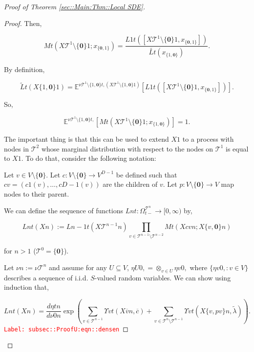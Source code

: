 \documentclass[12pt]{article}
\newcommand{\mb}{\mathbb}
\newcommand{\mc}{\mathcal}
\newcommand{\ra}{\rightarrow}
\newcommand{\ov}{\overline}
\newcommand{\tr}{\textcolor{red}}
\newcommand{\labe}[1]{\tr{\texttt{Label: #1}}}
\newcommand{\ind}{\hspace{24pt}}
\newcommand{\exmu}[2]{\mb{E}^{#1}\left[#2\right]}	%
\newcommand{\defeq}{:=}								%
\renewcommand{\root}{\mathbf{0}}				%
\renewcommand{\v}{v}							%
\renewcommand{\U}{U}							%
\renewcommand{\S}{S}							%
\newcommand{\x}{x}								%
\renewcommand{\t}{t}							%
\newcommand{\sset}{\Omega}						%
\newcommand{\X}{X}								%
\newcommand{\vsi}[1]{^{#1}}						%
\newcommand{\cind}[1]{_{#1}}					%
\newcommand{\cl}{\ov}							%
\newcommand{\tip}[1]{#1}						%
\newcommand{\ts}[1]{_{#1}}						%
\newcommand{\degr}{D}							%
\newcommand{\IGrg}{\ov{c}}						%
\newcommand{\tree}{\mc{T}}						%
\newcommand{\sln}[1]{^{#1}}						%
\newcommand{\alt}[1]{\widetilde{#1}}			%
\newcommand{\mm}{\nu}							%
\newcommand{\mmm}{\eta}							%
\newcommand{\crate}{\alt{\lambda}}				%
\newcommand{\dense}{L}							%
\newcommand{\cdense}{M}							%
\newcommand{\ds}{\Upsilon}						%
\renewcommand{\c}{c}							%
\newcommand{\p}{p}								%
\begin{document}
\begin{proof}[Proof of Theorem \ref{sec::Main:Thm::Local SDE}]
\begin{proof}
Then,

\[\cdense{}{\t}(\X{\tree\sln{1}\setminus\{\root\}}{}{1};\x\cind{\{\root,1\}}\tip{}) = \frac{\dense{1}{\t}([\X{\tree\sln{1}\setminus\{\root\}}{}{1},\x\cind{\{\root,1\}}\tip{}])}{\alt{\dense{}{\t}}(\x\cind{\{1,\root\}}\tip{})}.\]

By definition,

\[\alt{\dense}{}{\t}(\X{\{1,\root\}}{}{1}) = \exmu{\mm{\tree\sln{1}\setminus\{1,\root\}}{\t,}{}(\X{\tree\sln{1}\setminus\{1,\root\}}{}{1})}{\dense{1}{\t}([\X{\tree\sln{1}\setminus\{\root\}}{}{1},\x\cind{\{\root,1\}}\tip{}])}.\]

So,

\[\exmu{\mm{\tree\sln{1}\setminus\{1,\root\}}{\t,}{}}{\cdense{}{\t}(\X{\tree\sln{1}\setminus\{\root\}}{}{1};\x\cind{\{1,\root\}}\tip{})} = 1.\]

The important thing is that this can be used to extend \(\X{}{}{1}\) to a process with nodes in \(\tree\sln{2}\) whose marginal distribution with respect to the nodes on \(\tree\sln{1}\) is equal to \(\X{}{}{1}\). To do that, consider the following notation:

\ind Let \(\v \in V\setminus\{\root\}\). Let \(\c{}:V\setminus\{\root\} \ra V^{\degr-1}\) be defined such that \(\c{\v} = (\c{1}(\v),\dots,\c{\degr-1}(\v))\) are the children of \(\v\). Let \(\p{}:V\setminus\{\root\}\ra V\) map nodes to their parent.

\ind We can define the sequence of functions \(\dense{n}{\t}: \sset\vsi{\tree\sln{n}}\ts{\t-} \ra [0,\infty)\) by,

\[\dense{n}{\t}(\X{}{}{n}) := \dense{n-1}{\t}(\X{\tree\sln{n-1}}{}{n})\prod_{\v\in \tree\sln{n-1}\setminus\tree\sln{n-2}} \cdense{}{\t}(\X{\c{\v}}{}{n};\X{\{\v,\root\}}{}{n})\]

for \(n > 1\) (\(\tree\sln{0} = \{\root\}\)). 

\ind Let \(\mm{}{}{n}\defeq \mm{\tree\sln{n}}{}{}\) and assume for any \(\U \subseteq V\), \(\mmm{\U}{0,}{} = \otimes_{\v\in\U}\mmm{\v}{0,}{}\) where \(\{\mmm{\v}{0,}{}:\v\in V\}\) describes a sequence of i.i.d. \(\S\)-valued random variables. We can show using induction that,

\begin{equation}
\dense{n}{\t}(\X{}{}{n}) = \frac{d\mmm{}{\t}{n}}{d\mm{}{0}{n}}\exp\left(\sum_{\v\in\tree\sln{n-1}}\ds{\v}{\t}(\X{\cl{\v}}{}{n},\IGrg{}) + \sum_{\v\in\tree\sln{n}\setminus\tree\sln{n-1}} \ds{\v}{\t}(\X{\{v,\p{\v}\}}{}{n},\crate{}{})\right).
\label{subsec::ProofU:eqn::densen}
\end{equation}
\labe{subsec::ProofU:eqn::densen}


\end{proof}
\end{proof}
\end{document}
